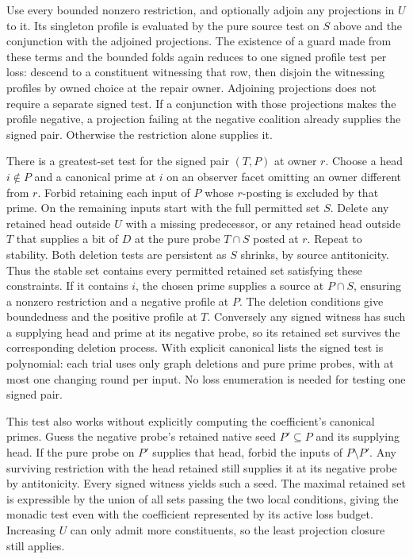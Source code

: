Use every bounded nonzero restriction, and optionally
adjoin any projections in $U$ to it. Its singleton profile
is evaluated by the pure source test on $S$ above and the
conjunction with the adjoined projections. The existence
of a guard made from these terms and the bounded folds
again reduces to one signed profile test per loss: descend
to a constituent witnessing that row, then disjoin the
witnessing profiles by owned choice at the repair owner.
Adjoining projections does not require a separate signed
test. If a conjunction with those projections makes the
profile negative, a projection failing at the negative
coalition already supplies the signed pair. Otherwise the
restriction alone supplies it.

There is a greatest-set test for the signed pair $(T,P)$
at owner $r$. Choose a head $i\notin P$ and a canonical
prime at $i$ on an observer facet omitting an owner
different from $r$. Forbid retaining each input of $P$
whose $r$-posting is excluded by that prime. On the
remaining inputs start with the full permitted set $S$.
Delete any retained head outside $U$ with a missing
predecessor, or any retained head outside $T$ that
supplies a bit of $D$ at the pure probe $T\cap S$
posted at $r$. Repeat to stability. Both deletion tests
are persistent as $S$ shrinks, by source antitonicity.
Thus the stable set contains every permitted retained
set satisfying these constraints. If it contains $i$,
the chosen prime supplies a source at $P\cap S$,
ensuring a nonzero restriction and a negative profile
at $P$. The deletion conditions give boundedness and
the positive profile at $T$. Conversely any signed
witness has such a supplying head and prime at its
negative probe, so its retained set survives the
corresponding deletion process. With explicit canonical
lists the signed test is polynomial: each trial uses only
graph deletions and pure prime probes, with at most one
changing round per input. No loss enumeration is needed
for testing one signed pair.

This test also works without explicitly computing the
coefficient's canonical primes. Guess the negative
probe's retained native seed $P'\subseteq P$ and its
supplying head. If the pure probe on $P'$ supplies
that head, forbid the inputs of $P\setminus P'$.
Any surviving restriction with the head retained still
supplies it at its negative probe by antitonicity.
Every signed witness yields such a seed. The maximal
retained set is expressible by the union of all sets
passing the two local conditions, giving the monadic
test even with the coefficient represented by its active
loss budget. Increasing $U$ can only admit more
constituents, so the least projection closure still applies.

